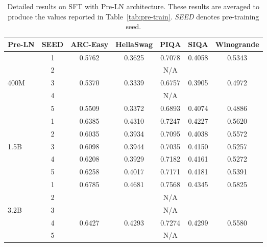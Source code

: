 \begin{table}[!ht]
\vskip -0.1in
\small
    \centering
            \caption{Detailed results on SFT with Pre-LN architecture. These results are averaged to produce the values reported in Table~\ref{tab:pre-train}. \textit{SEED} denotes pre-training seed.}
    \begin{tabular}{lcccccc}
            \toprule
        Pre-LN & SEED & ARC-Easy & HellaSwag & PIQA & SIQA & Winogrande \\ 
        \toprule
        ~ & 1 & 0.5762 & 0.3625 & 0.7078 & 0.4058 & 0.5343 \\ 
        ~ & 2 & ~ & ~ & N/A & ~ & ~ \\ 
        400M & 3 & 0.5370 & 0.3339 & 0.6757 & 0.3905 & 0.4972 \\ 
        ~ & 4 & ~ & ~ & N/A & ~ & ~ \\ 
        ~ & 5 & 0.5509 & 0.3372 & 0.6893 & 0.4074 & 0.4886 \\ 
        \midrule
        ~ & 1 & 0.6385 & 0.4310 & 0.7247 & 0.4227 & 0.5620 \\ 
        ~ & 2 & 0.6035 & 0.3934 & 0.7095 & 0.4038 & 0.5572 \\ 
        1.5B & 3 & 0.6098 & 0.3944 & 0.7035 & 0.4150 & 0.5257 \\ 
        ~ & 4 & 0.6208 & 0.3929 & 0.7182 & 0.4161 & 0.5272 \\ 
        ~ & 5 & 0.6258 & 0.4017 & 0.7171 & 0.4181 & 0.5391 \\
        \midrule
        ~ & 1 & 0.6785 & 0.4681 & 0.7568 & 0.4345 & 0.5825 \\ 
        ~ & 2 & ~ & ~ & N/A & ~ & ~ \\ 
        3.2B & 3 & ~ & ~ & N/A & ~ & ~ \\ 
        ~ & 4 & 0.6427 & 0.4293 & 0.7274 & 0.4299 & 0.5580 \\ 
        ~ & 5 & ~ & ~ & N/A & ~ & ~ \\ 
        \bottomrule
    \end{tabular}
    \vskip -0.1in
\end{table}

